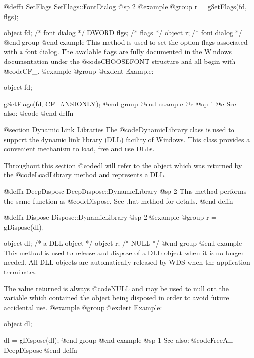 @deffn {SetFlags} SetFlags::FontDialog
@sp 2
@example
@group
r = gSetFlags(fd, flgs);

object  fd;     /*  font dialog  */
DWORD   flgs;   /*  flags        */
object  r;      /*  font dialog  */
@end group
@end example
This method is used to set the option flags associated with a font dialog.
The available flags are fully documented in the Windows documentation
under the @code{CHOOSEFONT} structure and all begin with @code{CF_}.
@example
@group
@exdent Example:

object  fd;

gSetFlags(fd, CF_ANSIONLY);
@end group
@end example
@c @sp 1
@c See also:  @code{}
@end deffn






@section Dynamic Link Libraries
The @code{DynamicLibrary} class is used to support the dynamic link
library (DLL) facility of Windows.  This class provides a convenient
mechanism to load, free and use DLLs.

Throughout this section @code{dl} will refer to the object which was
returned by the @code{LoadLibrary} method and represents a DLL.








@deffn {DeepDispose} DeepDispose::DynamicLibrary
@sp 2
This method performs the same function as @code{Dispose}.  See that
method for details.
@end deffn







@deffn {Dispose} Dispose::DynamicLibrary
@sp 2
@example
@group
r = gDispose(dl);

object  dl;   /*  a DLL object  */
object  r;    /*  NULL          */
@end group
@end example
This method is used to release and dispose of a DLL object when it is no
longer needed.  All DLL objects are automatically released by WDS when
the application terminates.

The value returned is always @code{NULL} and may be used to null out
the variable which contained the object being disposed in order to
avoid future accidental use.
@example
@group
@exdent Example:

object  dl;

dl = gDispose(dl);
@end group
@end example
@sp 1
See also:  @code{FreeAll, DeepDispose}
@end deffn









